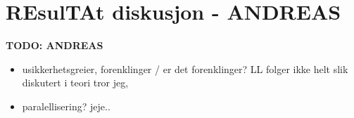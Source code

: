 \section{REsulTAt diskusjon - {{ANDREAS}}}
\label{sect:disc:res}
\textbf{\LARGE TODO: {{ANDREAS}}}
\begin{itemize}
  \item usikkerhetsgreier, forenklinger / er det forenklinger? LL folger ikke helt slik diskutert i teori tror jeg,
  \item paralellisering? jeje..
\end{itemize}